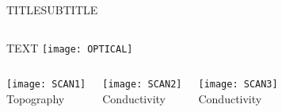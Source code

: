 \begin{frame}{TITLE}{SUBTITLE}
\begin{columns}
TEXT
 \texttt{[image: OPTICAL]}\\
 \end{columns}

 \begin{columns}
   \begin{center}
  \texttt{[image: SCAN1]} \\ Topography
     \end{center}
  \begin{center}
  \texttt{[image: SCAN2]} \\ Conductivity
   \end{center}
  \begin{center}
  \texttt{[image: SCAN3]} \\ Conductivity
   \end{center}

  \end{columns}

\end{frame}